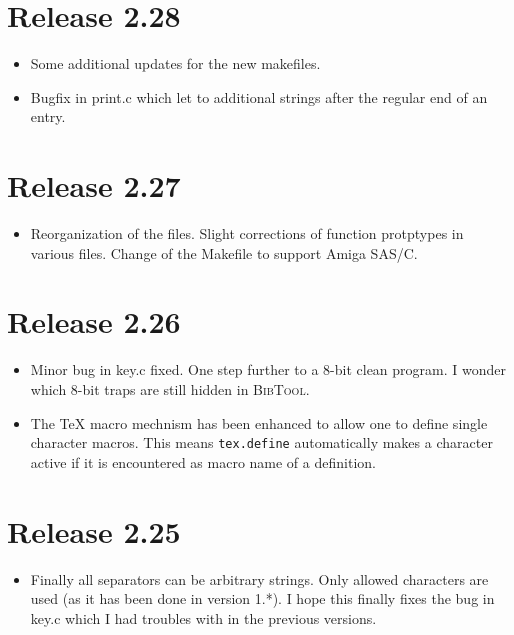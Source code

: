 \documentclass[11pt,a4paper]{scrartcl}
\newcommand\rsc[1]{\texttt{#1}}
\newcommand\File[1]{\textsf{#1}}
\newcommand\BibTool{\textsc{BibTool}}
\newenvironment{Release}[2]{%
  \def\tmp{#2}%
  \section*{Release #1 \ifx\tmp\empty\else{\normalsize[#2]}\fi}
  \begin{itemize}
}{\end{itemize}}
\newenvironment{Fix}[1]{\item }{}
\newenvironment{Update}[1]{\item }{}
\begin{document}
\begin{multicols}
 \begin{Release}{2.28}{}
  \begin{Update}{gene}
    Some additional updates for the new makefiles.
  \end{Update}
  \begin{Fix}{gene}
    Bugfix in \File{print.c} which let to additional strings after the
    regular end of an entry.
  \end{Fix}
 \end{Release}

 \begin{Release}{2.27}{}
  \begin{Update}{gene}
    Reorganization of the files. Slight corrections of function
    protptypes in various files. Change of the \File{Makefile} to
    support Amiga SAS/C.
  \end{Update}
 \end{Release}

 \begin{Release}{2.26}{}
  \begin{Fix}{gene}
    Minor bug in \File{key.c} fixed. One step further to a 8-bit clean
    program. I wonder which 8-bit traps are still hidden in \BibTool.
  \end{Fix}
  \begin{Update}{gene}
    The \TeX{} macro mechnism has been enhanced to allow one to define
    single character macros. This means \rsc{tex.define}
    automatically makes a character active if it is encountered as
    macro name of a definition.
  \end{Update}
 \end{Release}

 \begin{Release}{2.25}{}
  \begin{Update}{gene}
    Finally all separators can be arbitrary strings. Only allowed
    characters are used (as it has been done in version 1.*). I hope
    this finally fixes the bug in key.c which I had troubles with in
    the previous versions.
  \end{Update}
 \end{Release}


\end{multicols}
\end{document}
